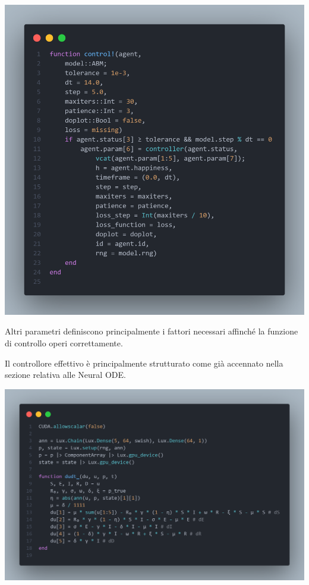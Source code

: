 \begin{minipage}{\linewidth}
	\centering
	\includegraphics[width=\textwidth]{img/controller_neuralode.png}
	\label{fig:controller_abm}
\end{minipage}

Altri parametri definiscono principalmente i fattori necessari affinché 
la funzione di controllo operi correttamente. 

Il controllore effettivo è principalmente strutturato come già 
accennato nella sezione relativa alle Neural ODE.

\begin{minipage}{\linewidth}
	\centering
	\includegraphics[width=\textwidth]{img/fann.png}
	\label{fig:controller1}
\end{minipage}

